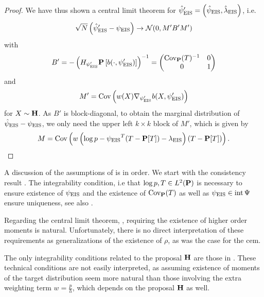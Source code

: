 \begin{proof}
    We have thus shown a central limit theorem for $\hat\psi'_{\eis} = \left( \hpeis, \hat\lambda_{\eis} \right)$, i.e. 
    $$
        \sqrt{N} \left( \hat\psi'_{\eis} - \peis \right) \to \mathcal N(0, M'B'M')
    $$
    with $$
        B' = - \left(H_{\psi'_{\eis}} \P \left[ b(\cdot, \psi'_{\eis}) \right]\right)^{-1} = \begin{pmatrix}
            \cov_{\P}(T)^{-1} & 0 \\
            0 & 1 
        \end{pmatrix}
    $$ and $$
        M' = \cov \left( w(X) \nabla_{\psi'_{\eis}} b(X,\psi'_{\eis}) \right) 
    $$ 
    for $X \sim \H$. As $B'$ is block-diagonal, to obtain the marginal distribution of $\hpeis - \peis$, we only need the upper left $k \times k$ block of $M'$, which is given by
    $$
        M = \cov \left( w \left( \log p - \peis^{T}(T - \P[T]) - \lambda_{\eis} \right)(T - \P [T]) \right).
    $$
\end{proof}


A discussion of the assumptions of  is in order. We start with the consistency result . The integrability condition, i.e that $\log p, T \in L^{2}(\P)$ is necessary to ensure existence of $\peis$ and the existence of $\cov_{\P}(T)$ as well as $\peis \in \operatorname{int} \Psi$ ensure uniqueness, see also . 

Regarding the central limit theorem, , requiring the existence of higher order moments is natural. Unfortunately, there is no direct interpretation of these requirements as generalizations of the existence of $\rho$, as was the case for the \gls{cem}. 

The only integrability conditions related to the proposal $\H$ are those in . 
These technical conditions are not easily interpreted, as assuming existence of moments of the target distribution seem more natural than those involving the extra weighting term $w = \frac{p}{h}$, which depends on the proposal $\H$ as well. 